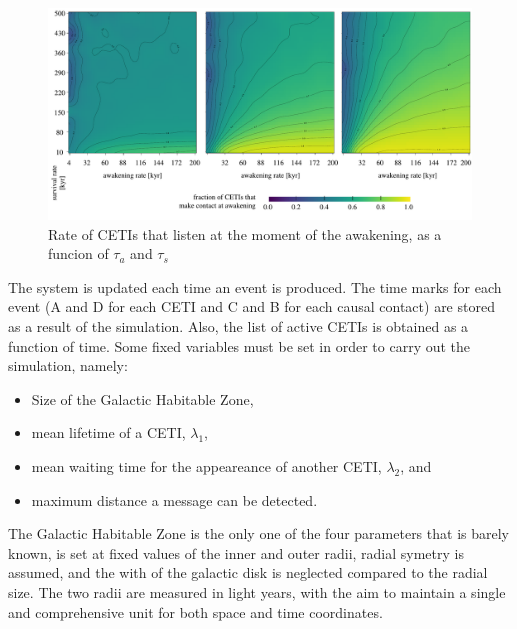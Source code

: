 \documentclass[crop]{CSLB}%
\begin{document}
  
\begin{figure} %
   \centering
   \includegraphics[width=\textwidth]{matrix_2.pdf}
   \caption{Rate of CETIs that listen at the moment of the
   awakening, as a funcion of $\tau_a$ and $\tau_s$}
   \label{F_C_at_A}
\end{figure}
                         


The system is updated each time an event is produced.
%
The time marks for each event (A and D for each CETI and C and B for
each causal contact) are stored as a result of the simulation.
%
Also, the list of active CETIs is obtained as a function of time.
%
Some fixed variables must be set in order to carry out the simulation,
namely:

\begin{itemize}
   \item Size of the Galactic Habitable Zone,
   \item mean lifetime of a CETI, $\lambda_1$,
   \item mean waiting time for the appeareance of another CETI,
      $\lambda_2$, and
   \item maximum distance a message can be detected.
\end{itemize}

The Galactic Habitable Zone is the only one of the four parameters
that is barely known, is set at fixed values of the inner and
outer radii, radial symetry is assumed, and the with of the
galactic disk is neglected compared to the radial size.
%
The two radii are measured in light years, with the aim to maintain a
single and comprehensive unit for both space and time coordinates. 
\end{document}
